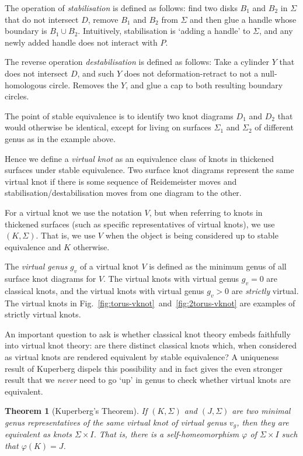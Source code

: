 \documentclass[12pt]{report}
\newtheorem*{theorem}{Theorem}
\begin{document}
The operation of \textit{stabilisation} is defined as follows: find two disks $B_{1}$ and $B_{2}$ in $\Sigma$ that do not intersect $D$, remove $B_{1}$ and $B_{2}$ from $\Sigma$ and then glue a handle whose boundary is $B_{1} \cup B_{2}$. Intuitively, stabilisation is `adding a handle' to $\Sigma$, and any newly added handle does not interact with $P$.

The reverse operation \textit{destabilisation} is defined as follows: Take a cylinder $Y$ that does not intersect $D$, and such $Y$ does not deformation-retract to not a null-homologous circle. Removes the $Y$, and glue a cap to both resulting boundary circles.

The point of stable equivalence is to identify two knot diagrams $D_{1}$ and $D_{2}$ that would otherwise be identical, except for living on surfaces $\Sigma_{1}$ and $\Sigma_{2}$ of different genus as in the example above.

Hence we define a \textit{virtual knot} as an equivalence class of knots in thickened surfaces under stable equivalence. Two surface knot diagrams represent the same virtual knot if there is some sequence of Reidemeister moves and stabilisation/destabilisation moves from one diagram to the other.

For a virtual knot we use the notation $V$, but when referring to knots in thickened surfaces (such as specific representatives of virtual knots), we use $(K, \Sigma)$. That is, we use $V$ when the object is being considered up to stable equivalence and $K$ otherwise.

The \textit{virtual genus} $g_{v}$ of a virtual knot $V$ is defined as the minimum genus of all surface knot diagrams for $V$. The virtual knots with virtual genus $g_{v} = 0$ are classical knots, and the virtual knots with virtual genus $g_{v} > 0$ are \textit{strictly} virtual. The virtual knots in Fig.~\ref{fig:torus-vknot}~and~\ref{fig:2torus-vknot} are examples of strictly virtual knots.

An important question to ask is whether classical knot theory embeds faithfully into virtual knot theory: are there distinct classical knots which, when considered as virtual knots are rendered equivalent by stable equivalence? A uniqueness result of Kuperberg dispels this possibility and in fact gives the even stronger result that we \textit{never} need to go `up' in genus to check whether virtual knots are equivalent.

\begin{theorem}[Kuperberg's Theorem]
If $(K, \Sigma)$ and $(J, \Sigma)$ are two minimal genus representatives of the same virtual knot of virtual genus $v_{g}$, then they are equivalent as knots $\Sigma \times I$. That is, there is a self-homeomorphism $\varphi$ of $\Sigma \times I$ such that $\varphi(K) = J$.
\end{theorem}
\end{document}
